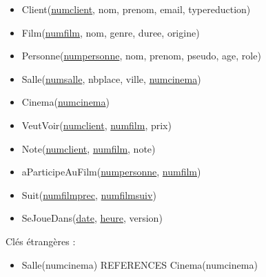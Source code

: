 \documentclass{article}
\begin{document}
\begin{itemize}
    \item Client(\underline{num\textunderscore client}, nom, prenom, email, type\textunderscore reduction) 
    \item Film(\underline{num\textunderscore film}, nom, genre, duree, origine)  
    \item Personne(\underline{num\textunderscore personne}, nom, prenom, pseudo, age, role) 
    \item Salle(\underline{num\textunderscore salle}, nb\textunderscore place, ville, \underline{num\textunderscore cinema})
    \item Cinema(\underline{num\textunderscore cinema}) 
    \item VeutVoir(\underline{num\textunderscore client}, \underline{num\textunderscore film}, prix)
    \item Note(\underline{num\textunderscore client}, \underline{num\textunderscore film}, note)
    \item aParticipeAuFilm(\underline{num\textunderscore personne}, \underline{num\textunderscore film})
    \item Suit(\underline{num\textunderscore film\textunderscore prec}, \underline{num\textunderscore film\textunderscore suiv})
    \item SeJoueDans(\underline{date}, \underline{heure}, version)
\end{itemize}
\newline
\newline
Clés étrangères :
\begin{itemize}
    \item Salle(num\textunderscore cinema) REFERENCES Cinema(num\textunderscore cinema)
\end{itemize}
\end{document}
